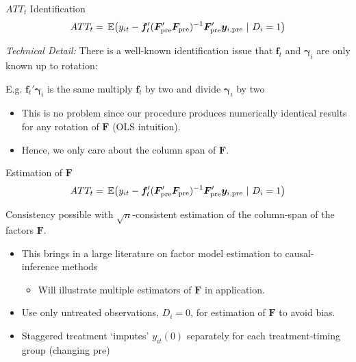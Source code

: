 \documentclass[aspectratio=169,t,11pt]{beamer}
\begin{document}
\begin{frame}{$ATT_t$ Identification}\label{slide:general_imputation_procedure}
  \vspace{-7.5mm}
  $$
    ATT_t = \expec{%
      y_{it} - \bm{f}_t' (\bm{F}_{\text{pre}}' \bm{F}_{\text{pre}})^{-1} \bm{F}_{\text{pre}}' \bm y_{i, \text{pre} } 
    }{D_i = 1} 
  $$

  \bigskip
  \emph{Technical Detail:}
  There is a well-known identification issue that $\bm{f}_t$ and $\bm{\gamma}_i$ are only known up to rotation: 
  
  E.g. $\bm{f}_t' \bm{\gamma}_i$ is the same multiply $\bm{f}_t$ by two and divide $\bm{\gamma}_i$ by two

  \pause
  \begin{itemize}
    \item This is no problem since our procedure produces numerically identical results for any rotation of $\bm{F}$ (OLS intuition).
    \item Hence, we only care about the column span of $\bm{F}$. 
  \end{itemize}

\end{frame}

\begin{frame}{Estimation of $\bm{F}$}
  \vspace{-7.5mm}
  $$
    ATT_t = \expec{%
      y_{it} - \bm{f}_t' (\bm{F}_{\text{pre}}' \bm{F}_{\text{pre}})^{-1} \bm{F}_{\text{pre}}' \bm y_{i, \text{pre} } 
    }{D_i = 1} 
  $$

  \bigskip
  Consistency possible with $\sqrt{n}$-consistent estimation of the column-span of the factors $\bm{F}$.

  \smallskip
  \begin{itemize}
    \item This brings in a large literature on factor model estimation to causal-inference methods
    \begin{itemize}
      \item Will illustrate multiple estimators of $\bm{F}$ in application. 
    \end{itemize}
    
    \pause 
    \item Use only untreated observations, $D_{i} = 0$, for estimation of $\bm{F}$ to avoid bias.
    \item Staggered treatment `imputes' $y_{it}(0)$ separately for each treatment-timing group (changing $\text{pre}$)
  \end{itemize}
\end{frame}
\end{document}
